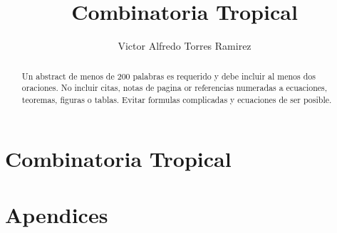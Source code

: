 \documentclass{amsart}
\begin{document}
\title{Combinatoria Tropical}

\author{Victor Alfredo Torres Ramirez}

\begin{abstract}
Un abstract de menos de 200 palabras es requerido y debe incluir
al menos dos oraciones. No incluir citas, notas de pagina or referencias
numeradas a ecuaciones, teoremas, figuras o tablas.
Evitar formulas complicadas y ecuaciones de ser posible.
\end{abstract}

\maketitle

\tableofcontents

\part{Combinatoria Tropical}





\part{Apendices}


\end{document}
